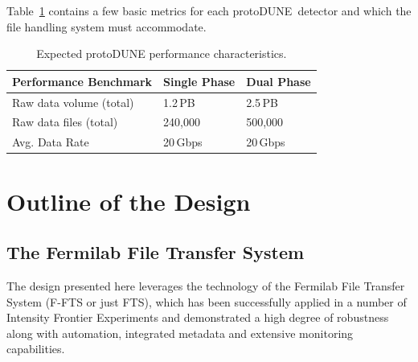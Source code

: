 \documentclass[pdftex,12pt,letter]{article}
\newcommand{\pd}{protoDUNE\ }
\begin{document}
\noindent
Table~\ref{fig:det_perf} contains a few basic metrics for each \pd detector
and which the file handling system must accommodate.


\begin{table}[tbh]
\centering
\begin{tabular}{l l l}
\hline
\textbf{Performance Benchmark} & \textbf{Single Phase} & \textbf{Dual Phase}\\
\hline
\hline
Raw data volume (total)                    & 1.2\,PB & 2.5\,PB \\
Raw data files (total)                      & 240,000  & 500,000\\
Avg. Data Rate                                & 20\,Gbps & 20\,Gbps \\
\hline
\end{tabular}
\caption{\label{fig:det_perf}Expected protoDUNE performance characteristics.}
\end{table}



\section{Outline of the Design}


\subsection{The Fermilab File Transfer System}
The design presented here leverages the technology of the Fermilab
File Transfer System (F-FTS or just FTS), which has been successfully
applied in a number of Intensity Frontier Experiments and demonstrated
a high degree of robustness along with automation, integrated metadata
and extensive monitoring capabilities.
\end{document}
